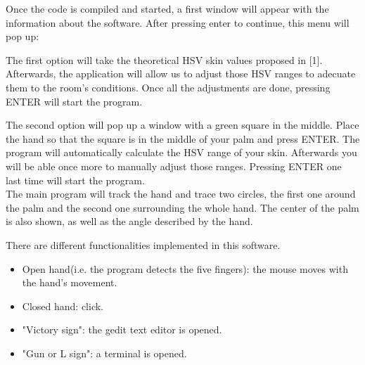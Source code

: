 Once the code is compiled and started, a first window will appear with the information about the software. After pressing enter to continue, this menu will pop up: 
\begin{center}
\end{center}

\vspace{1cm}
The first option will take the theoretical HSV skin values proposed in [1]. Afterwards, the application will allow us to adjust those HSV ranges to adecuate them to the room's conditions. 
Once all the adjustments are done, pressing ENTER will start the program. 

The second option will pop up a window with a green square in the middle. Place the hand so that the square is in the middle of your palm and press ENTER. The program will automatically calculate the HSV range of your skin. Afterwards you will be able once more to manually adjust those ranges. Pressing ENTER one last time will start the program. 
\\
 
The main program will track the hand and trace two circles, the first one around the palm and the second one surrounding the whole hand. The center of the palm is also shown, as well as the angle described by the hand. 

There are different functionalities implemented in this software. 
\begin{itemize}
\item Open hand(i.e. the program detects the five fingers): the mouse moves with the hand's movement.
\item Closed hand: click.
\item "Victory sign": the gedit text editor is opened.
\item "Gun or L sign": a terminal is opened. 
\end{itemize}

